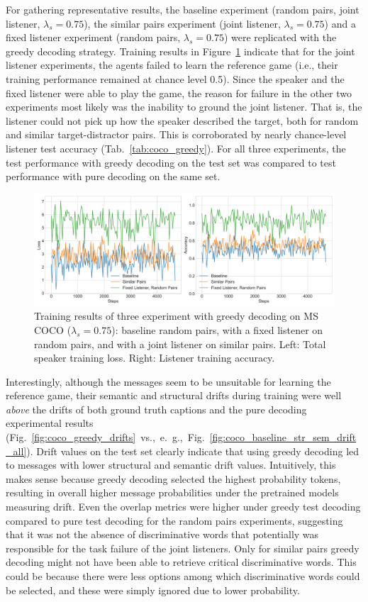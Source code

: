 For gathering representative results, the baseline experiment (random pairs, joint listener, $\lambda_s=0.75$), the similar pairs experiment (joint listener, $\lambda_s=0.75$) and a fixed listener experiment (random pairs, $\lambda_s=0.75$) were replicated with the greedy decoding strategy. Training results in Figure~\ref{fig:coco_greedy_baseline} indicate that for the joint listener experiments, the agents failed to learn the reference game (i.e., their training performance remained at chance level 0.5). Since the speaker and the fixed listener were able to play the game, the reason for failure in the other two experiments most likely was the inability to ground the joint listener. That is, the listener could not pick up how the speaker described the target, both for random and similar target-distractor pairs. This is corroborated by nearly chance-level listener test accuracy (Tab.~\ref{tab:coco_greedy}). For all three experiments, the test performance with greedy decoding on the test set was compared to test performance with pure decoding on the same set. 
\begin{figure}
	\centering
	\includegraphics[width=\linewidth]{images/coco_greedy_all_075_losses.png}
	\caption{Training results of three experiment with greedy decoding on MS COCO ($\lambda_s = 0.75$): baseline random pairs, with a fixed listener on random pairs, and with a joint listener on similar pairs. Left: Total speaker training loss. Right: Listener training accuracy.}
	\label{fig:coco_greedy_baseline}
\end{figure} 
Interestingly, although the messages seem to be unsuitable for learning the reference game, their semantic and structural drifts during training were well \emph{above} the drifts of both ground truth captions and the pure decoding experimental results (Fig.~\ref{fig:coco_greedy_drifts}~vs.,~e.~g.,~Fig.~\ref{fig:coco_baseline_str_sem_drift_all}). Drift values on the test set clearly indicate that using greedy decoding led to messages with lower structural and semantic drift values. Intuitively, this makes sense because greedy decoding selected the highest probability tokens, resulting in overall higher message probabilities under the pretrained models measuring drift. Even the overlap metrics were higher under greedy test decoding compared to pure test decoding for the random pairs experiments, suggesting that it was not the absence of discriminative words that potentially was responsible for the task failure of the joint listeners. Only for similar pairs greedy decoding might not have been able to retrieve critical discriminative words. This could be because there were less options among which discriminative words could be selected, and these were simply ignored due to lower probability.
